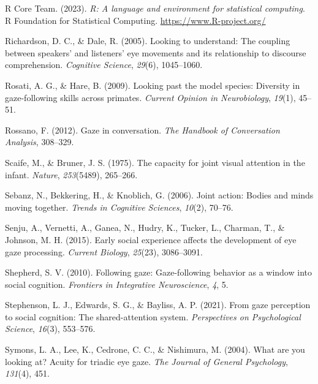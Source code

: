 \documentclass[
  man,floatsintext]{apa7}
\newlength{\cslhangindent}
\newlength{\cslentryspacingunit} %
\newenvironment{CSLReferences}[2] %
 {%
  \setlength{\parindent}{0pt}
  \ifodd #1
  \let\oldpar\par
  \def\par{\hangindent=\cslhangindent\oldpar}
  \fi
  \setlength{\parskip}{#2\cslentryspacingunit}
 }%
 {}
\begin{document}
\begin{CSLReferences}{1}{0}
\leavevmode{}%
R Core Team. (2023). \emph{R: A language and environment for statistical computing}. R Foundation for Statistical Computing. \url{https://www.R-project.org/}

\leavevmode{}%
Richardson, D. C., \& Dale, R. (2005). Looking to understand: The coupling between speakers' and listeners' eye movements and its relationship to discourse comprehension. \emph{Cognitive Science}, \emph{29}(6), 1045--1060.

\leavevmode{}%
Rosati, A. G., \& Hare, B. (2009). Looking past the model species: Diversity in gaze-following skills across primates. \emph{Current Opinion in Neurobiology}, \emph{19}(1), 45--51.

\leavevmode{}%
Rossano, F. (2012). Gaze in conversation. \emph{The Handbook of Conversation Analysis}, 308--329.

\leavevmode{}%
Scaife, M., \& Bruner, J. S. (1975). The capacity for joint visual attention in the infant. \emph{Nature}, \emph{253}(5489), 265--266.

\leavevmode{}%
Sebanz, N., Bekkering, H., \& Knoblich, G. (2006). Joint action: Bodies and minds moving together. \emph{Trends in Cognitive Sciences}, \emph{10}(2), 70--76.

\leavevmode{}%
Senju, A., Vernetti, A., Ganea, N., Hudry, K., Tucker, L., Charman, T., \& Johnson, M. H. (2015). Early social experience affects the development of eye gaze processing. \emph{Current Biology}, \emph{25}(23), 3086--3091.

\leavevmode{}%
Shepherd, S. V. (2010). Following gaze: Gaze-following behavior as a window into social cognition. \emph{Frontiers in Integrative Neuroscience}, \emph{4}, 5.

\leavevmode{}%
Stephenson, L. J., Edwards, S. G., \& Bayliss, A. P. (2021). From gaze perception to social cognition: The shared-attention system. \emph{Perspectives on Psychological Science}, \emph{16}(3), 553--576.

\leavevmode{}%
Symons, L. A., Lee, K., Cedrone, C. C., \& Nishimura, M. (2004). What are you looking at? Acuity for triadic eye gaze. \emph{The Journal of General Psychology}, \emph{131}(4), 451.


\end{CSLReferences}
\end{document}
